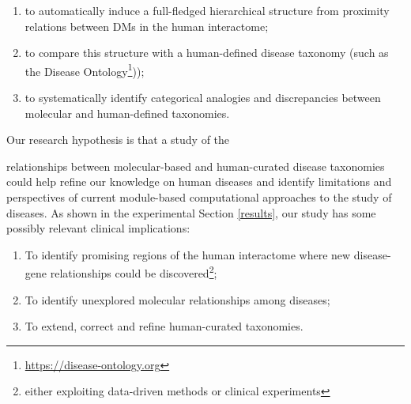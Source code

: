 \documentclass[journal,twoside,web]{ieeecolor}
\begin{document}
\begin{enumerate}
\item to automatically induce a full-fledged hierarchical structure from proximity relations between DMs in the human interactome; \item to compare this structure  with a human-defined disease taxonomy (such as the Disease Ontology\footnote{\url{https://disease-ontology.org}}));  
\item to systematically identify categorical analogies and discrepancies between molecular and human-defined taxonomies. 
\end{enumerate}
Our research hypothesis is that  a   study of the

relationships between molecular-based and human-curated disease taxonomies could help  refine our knowledge on human diseases and
identify limitations and perspectives of current module-based computational approaches to the study of diseases. 
As shown in the experimental Section \ref{results}, our study has some possibly relevant clinical implications: 


\begin{enumerate}
    \item To identify promising regions of the human interactome where new disease-gene relationships could be discovered\footnote{either exploiting data-driven methods or clinical experiments};
    \item To identify unexplored  molecular relationships among diseases;
    \item To extend, correct and refine human-curated taxonomies.
\end{enumerate}
\end{document}
